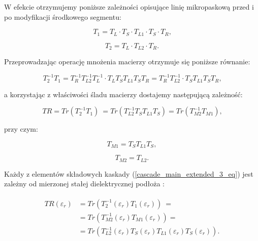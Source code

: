  \noindent W efekcie otrzymujemy poniższe zależności opisujące linię mikropaskową przed i po modyfikacji środkowego segmentu: 

  \begin{equation}
    \label{cascade_main_extended_eq}
      T_1=T_L\cdot T_{S}\cdot T_{L1}\cdot T_{S}\cdot T_R \text{,}
 \end{equation}

    \begin{equation}
    \label{cascade_main_extended_after_modification_eq}
      T_2=T_{L} \cdot T_{L2} \cdot T_{R} \text{.}
 \end{equation}

\noindent Przeprowadzając operację mnożenia macierzy otrzymuje się poniższe równanie:

   \begin{equation}
    \label{cascade_main_extended_2_eq}
     T_2^{-1}T_1=T_R^{-1}T_{L2}^{-1}T_L^{-1}\cdot T_LT_ST_{L1}T_S T_R = T_R^{-1}T_{L2}^{-1} \cdot T_ST_{L1}T_S T_R \text{,}
 \end{equation}

\noindent a korzystając z właściwości śladu macierzy dostajemy następującą zależność:

   \begin{equation}
    \label{cascade_main_extended_3_eq}
      TR=Tr\left(T_2^{-1}T_1\right)\ =Tr\left(T_{L2}^{-1}T_ST_{L1}T_S\right)=Tr\left(T_{M2}^{-1}T_{M1}\right) \text{,}
 \end{equation}

\noindent przy czym:

   \begin{equation}
    \label{cascade_main_extended_4_eq}
      T_{M1}=T_ST_{L1}T_S,
 \end{equation}

    \begin{equation}
    \label{cascade_main_extended_5_eq}
      T_{M2}=T_{L2} \text{.}
 \end{equation}

 \noindent Każdy z elementów składowych kaskady (\ref{cascade_main_extended_3_eq}) jest zależny od mierzonej stałej dielektrycznej podłoża \cite{cite:doktorat}:

  \begin{align}
   \begin{split}
    \label{cascade_main_epsilon_dependant_eq}
      TR \left( \varepsilon_r \right)&=
      Tr\left(T_2^{-1}\left( \varepsilon_r \right)T_1\left( \varepsilon_r \right)\right)\ = \\
  &=Tr\left(T_{M2}^{-1}\left( \varepsilon_r \right)T_{M1}\left( \varepsilon_r \right)\right)= \\
        &=Tr\left(T_{L2}^{-1}\left( \varepsilon_r \right)T_S\left( \varepsilon_r \right)T_{L1}\left( \varepsilon_r \right)T_S\left( \varepsilon_r \right)\right) \text{.}
 \end{split}    
 \end{align}




